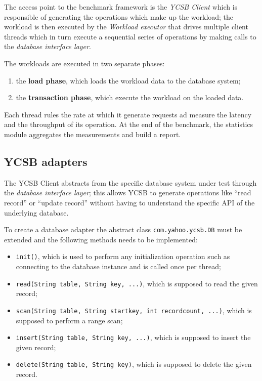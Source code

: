 \newparagraph The access point to the benchmark framework is the \textit{YCSB Client} which is responsible of generating the operations which make up the workload; the workload is then executed by the \textit{Workload executor} that drives multiple client threads which in turn execute a sequential series of operations by making calls to the \textit{database interface layer}.

\noindent The workloads are executed in two separate phases:
\begin{enumerate}
\item the \textbf{load phase}, which loads the workload data to the database system;
\item the \textbf{transaction phase}, which execute the workload on the loaded data.
\end{enumerate}
\noindent Each thread rules the rate at which it generate requests ad measure the latency and the throughput of its operation. At the end of the benchmark, the statistics module aggregates the measurements and build a report.

\subsection{YCSB adapters}
The YCSB Client abstracts from the specific database system under test through the \textit{database interface layer}; this allows YCSB to generate operations like ``read record'' or ``update record'' without having to understand the specific API of the underlying database.

\noindent To create a database adapter the abstract class \texttt{com.yahoo.ycsb.DB} must be extended and the following methods needs to be implemented:
\begin{itemize}
\item \texttt{init()}, which is used to perform any initialization operation such as connecting to the database instance and is called once per thread;
\item \texttt{read(String table, String key, ...)}, which is supposed to read the given record;
\item \texttt{scan(String table, String startkey, int recordcount, ...)}, which is supposed to perform a range scan;
\item \texttt{insert(String table, String key, ...)}, which is supposed to insert the given record;
\item \texttt{delete(String table, String key)}, which is supposed to delete the given record.
\end{itemize}

